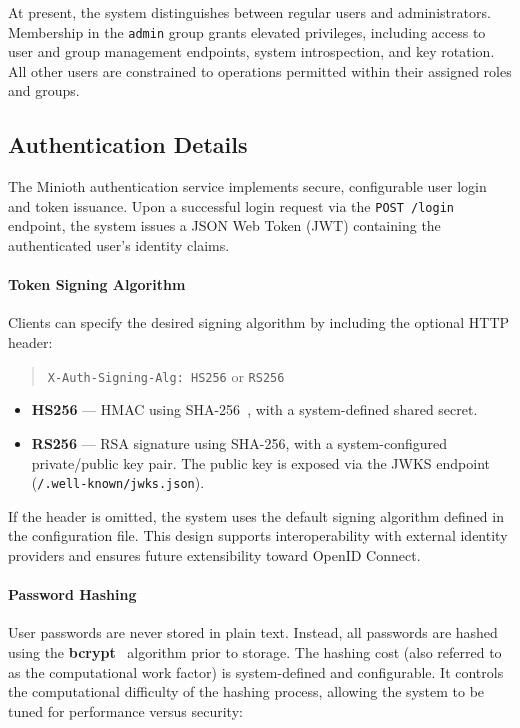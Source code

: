 At present, the system distinguishes between regular users and administrators. Membership in the \texttt{admin} group grants elevated privileges, including access to user and group management endpoints, system introspection, and key rotation. All other users are constrained to operations permitted within their assigned roles and groups.

\subsection{Authentication Details}

The Minioth authentication service implements secure, configurable user login and token issuance. Upon a successful login request via the \texttt{POST /login} endpoint, the system issues a JSON Web Token (JWT) containing the authenticated user's identity claims.

\paragraph{Token Signing Algorithm}
Clients can specify the desired signing algorithm by including the optional HTTP header:

\begin{quote}
\texttt{X-Auth-Signing-Alg: HS256} \quad or \quad \texttt{RS256}~\cite{jose-algorithms}
\end{quote}

\begin{itemize}
  \item \textbf{HS256} — HMAC using SHA-256~\cite{sha256-rfc6234}, with a system-defined shared secret.
  \item \textbf{RS256} — RSA signature using SHA-256, with a system-configured private/public key pair. 
  The public key is exposed via the JWKS endpoint (\texttt{/.well-known/jwks.json}).
\end{itemize}

If the header is omitted, the system uses the default signing algorithm defined in the configuration file. 
This design supports interoperability with external identity providers and ensures future extensibility toward OpenID Connect.

\paragraph{Password Hashing}
User passwords are never stored in plain text. Instead, all passwords are hashed using the \textbf{bcrypt}~\cite{bcrypt} 
algorithm prior to storage. The hashing cost (also referred to as the computational work factor) is system-defined and configurable. 
It controls the computational difficulty of the hashing process, allowing the system to be tuned for performance versus security:

